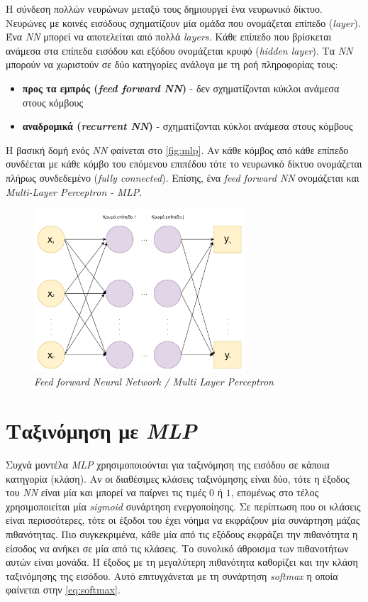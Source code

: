 Η σύνδεση πολλών νευρώνων μεταξύ τους δημιουργεί ένα νευρωνικό δίκτυο. Νευρώνες με κοινές εισόδους σχηματίζουν μία ομάδα που ονομάζεται επίπεδο (\emph{layer}). Ένα \emph{NN} μπορεί να αποτελείται από πολλά \emph{layers}. Κάθε επίπεδο που βρίσκεται ανάμεσα στα επίπεδα εισόδου και εξόδου ονομάζεται κρυφό (\emph{hidden layer}). 
Τα \emph{NN} μπορούν να χωριστούν σε δύο κατηγορίες ανάλογα με τη ροή πληροφορίας τους:
\begin{itemize}
    \item \textbf{προς τα εμπρός (\emph{feed forward NN})} - δεν σχηματίζονται κύκλοι ανάμεσα στους κόμβους
    \item \textbf{αναδρομικά (\emph{recurrent NN})} - σχηματίζονται κύκλοι ανάμεσα στους κόμβους
\end{itemize}

Η βασική δομή ενός \emph{NN} φαίνεται στο \autoref{fig:mlp}. Αν κάθε κόμβος από κάθε επίπεδο συνδέεται με κάθε κόμβο του επόμενου επιπέδου τότε το νευρωνικό δίκτυο ονομάζεται πλήρως συνδεδεμένο (\emph{fully connected}). Επίσης, ένα \emph{feed forward NN} ονομάζεται και \emph{Multi-Layer Perceptron - MLP}.

\begin{figure}[!ht]
  \centering
  \captionsetup{justification=centering}
  \includegraphics[width=0.7\textwidth]{images/chapter2/mlp.png}
  \caption{\emph{Feed forward Neural Network / Multi Layer Perceptron}}
  \label{fig:mlp}
\end{figure}
\noindent

\section{Ταξινόμηση με \emph{MLP}}
Συχνά μοντέλα \emph{MLP} χρησιμοποιούνται για ταξινόμηση της εισόδου σε κάποια κατηγορία (κλάση). Αν οι διαθέσιμες κλάσεις ταξινόμησης είναι δύο, τότε η έξοδος του \emph{NN} είναι μία και μπορεί να παίρνει τις τιμές $0$ ή $1$, επομένως στο τέλος χρησιμοποιείται μία \emph{sigmoid} συνάρτηση ενεργοποίησης. Σε περίπτωση που οι κλάσεις είναι περισσότερες, τότε οι έξοδοι του έχει νόημα να εκφράζουν μία συνάρτηση μάζας πιθανότητας. Πιο συγκεκριμένα, κάθε μία από τις εξόδους εκφράζει την πιθανότητα η είσοδος να ανήκει σε μία από τις κλάσεις. Το συνολικό άθροισμα των πιθανοτήτων αυτών είναι μονάδα. Η έξοδος με τη μεγαλύτερη πιθανότητα καθορίζει και την κλάση ταξινόμησης της εισόδου. Αυτό επιτυγχάνεται με τη συνάρτηση \emph{softmax} η οποία φαίνεται στην \autoref{eq:softmax}.

